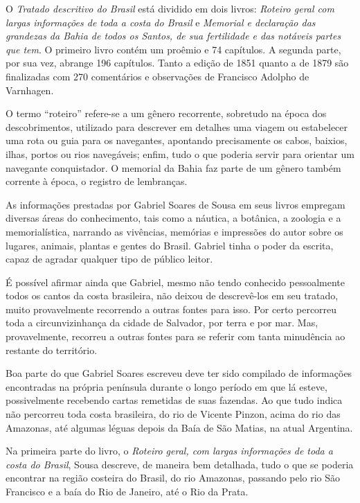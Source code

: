 \documentclass[12pt]{extarticle}
\begin{document}
{O \textit{Tratado descritivo do Brasil} está dividido em dois livros: 
\textit{Roteiro geral com largas informações de toda a costa do Brasil} e \textit{Memorial e declaração das grandezas da Bahia de todos os Santos, de sua fertilidade e das notáveis partes que tem}. O primeiro livro contém um proêmio e 74 capítulos. A segunda parte, por sua vez, abrange 196 capítulos. Tanto a edição de 1851 quanto a de 1879 são finalizadas com 270 comentários e observações de Francisco Adolpho de Varnhagen.

O termo ``roteiro'' refere-se a um gênero recorrente, sobretudo na época dos descobrimentos, utilizado para descrever em detalhes uma viagem ou estabelecer uma rota ou guia para os navegantes, apontando precisamente os cabos, baixios, ilhas, portos ou rios navegáveis; enfim, tudo o que poderia servir para orientar um navegante conquistador. O memorial da Bahia faz parte de um gênero também corrente à época, o registro de lembranças.

As informações prestadas por Gabriel Soares de Sousa em seus livros empregam diversas áreas do conhecimento, tais como a náutica, a botânica, a zoologia e a memorialística, narrando as vivências, memórias e impressões do autor sobre os lugares, animais, plantas e gentes do Brasil. Gabriel tinha o poder da escrita, capaz de agradar qualquer tipo de público leitor.

É possível afirmar ainda que Gabriel, mesmo não tendo conhecido pessoalmente todos os cantos da costa brasileira, não deixou de descrevê-los em seu tratado, muito provavelmente recorrendo a outras fontes para isso. Por certo percorreu toda a circunvizinhança da cidade de Salvador, por terra e por mar. Mas, provavelmente, recorreu a outras fontes para se referir com tanta minudência ao restante do território.

Boa parte do que Gabriel Soares escreveu deve ter sido compilado de informações encontradas na própria península durante o longo período em que lá esteve, possivelmente recebendo cartas remetidas de suas fazendas. Ao que tudo indica não percorreu toda costa brasileira, do rio de Vicente Pinzon, acima do rio das Amazonas, até algumas léguas depois da Baía de São Matias, na atual Argentina. 

Na primeira parte do livro, o \emph{Roteiro geral, com largas informações de toda a costa do Brasil}, Sousa descreve, de maneira bem detalhada, tudo o que se poderia encontrar na região costeira do Brasil, do rio Amazonas, passando pelo rio São Francisco e a baía do Rio de Janeiro, até o Rio da Prata.

}
\end{document}
